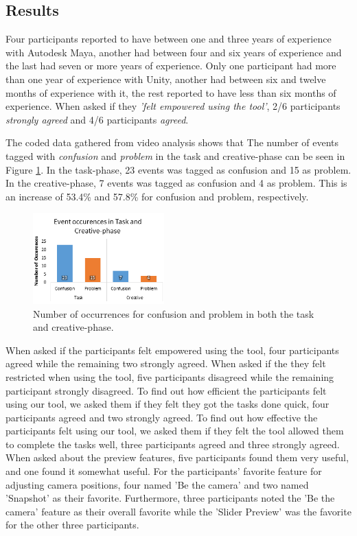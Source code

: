 \subsection{Results} \label{results}
Four participants reported to have between one and three years of experience with Autodesk Maya, another had between four and six years of experience and the last had seven or more years of experience. Only one participant had more than one year of experience with Unity, another had between six and twelve months of experience with it, the rest reported to have less than six months of experience.
When asked if they \textit{'felt empowered using the tool'}, 2/6 participants \textit{strongly agreed} and 4/6 participants \textit{agreed}.

The coded data gathered from video analysis shows that The number of events tagged with \textit{confusion} and \textit{problem} in the task and creative-phase can be seen in Figure \ref{fig:codedgraph}. In the task-phase, 23 events was tagged as confusion and 15 as problem. In the creative-phase, 7 events was tagged as confusion and 4 as problem. This is an increase of 53.4\% and 57.8\% for confusion and problem, respectively.

\begin{figure}[htbp]
\centering
\includegraphics[width=0.45\textwidth]{Pics/codedgraph2}
\caption{Number of occurrences for confusion and problem in both the task and creative-phase.}
\label{fig:codedgraph}
\end{figure}

When asked if the participants felt empowered using the tool, four participants agreed while the remaining two strongly agreed. When asked if the they felt restricted when using the tool, five participants disagreed while the remaining participant strongly disagreed. To find out how efficient the participants felt using our tool, we asked them if they felt they got the tasks done quick, four participants agreed and two strongly agreed. To find out how effective the participants felt using our tool, we asked them if they felt the tool allowed them to complete the tasks well, three participants agreed and three strongly agreed.
When asked about the preview features, five participants found them very useful, and one found it somewhat useful. For the participants' favorite feature for adjusting camera positions, four named 'Be the camera' and two named 'Snapshot' as their favorite. Furthermore, three participants noted the 'Be the camera' feature as their overall favorite while the 'Slider Preview' was the favorite for the other three participants. 
